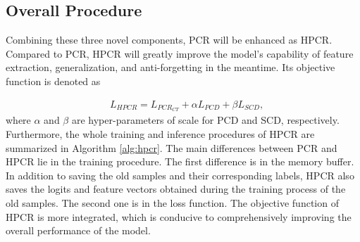 \subsection{Overall Procedure}
Combining these three novel components, PCR will be enhanced as HPCR. Compared to PCR, HPCR will greatly improve the model's capability of feature extraction, generalization, and anti-forgetting in the meantime. Its objective function is denoted as

\begin{equation}
\label{eq:hpcr}
\begin{split}
    &
    L_{HPCR}=L_{PCR_{CT}}+\alpha L_{PCD}+\beta L_{SCD},
\end{split}
\end{equation}
where $\alpha$ and $\beta$ are hyper-parameters of scale for PCD and SCD, respectively. Furthermore, the whole training and inference procedures of HPCR are summarized in Algorithm \ref{alg:hpcr}. The main differences between PCR and HPCR lie in the training procedure. The first difference is in the memory buffer. In addition to saving the old samples and their corresponding labels, HPCR also saves the logits and feature vectors obtained during the training process of the old samples. The second one is in the loss function. The objective function of HPCR is more integrated, which is conducive to comprehensively improving the overall performance of the model.
